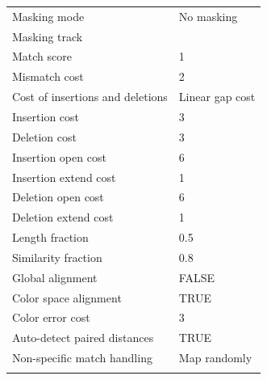 \begin{longtable}{ll}
Masking mode                                 & No masking                                     \\
Masking track                                &                                                \\
Match score                                  & 1                                              \\
Mismatch cost                                & 2                                              \\
Cost of insertions and deletions             & Linear gap cost                                \\
Insertion cost                               & 3                                              \\
Deletion cost                                & 3                                              \\
Insertion open cost                          & 6                                              \\
Insertion extend cost                        & 1                                              \\
Deletion open cost                           & 6                                              \\
Deletion extend cost                         & 1                                              \\
Length fraction                              & 0.5                                            \\
Similarity fraction                          & 0.8                                            \\
Global alignment                             & FALSE                                          \\
Color space alignment                        & TRUE                                           \\
Color error cost                             & 3                                              \\
Auto-detect paired distances                 & TRUE                                           \\
Non-specific match handling                  & Map randomly                                   \\
                                             &                                                \\

\end{longtable}
